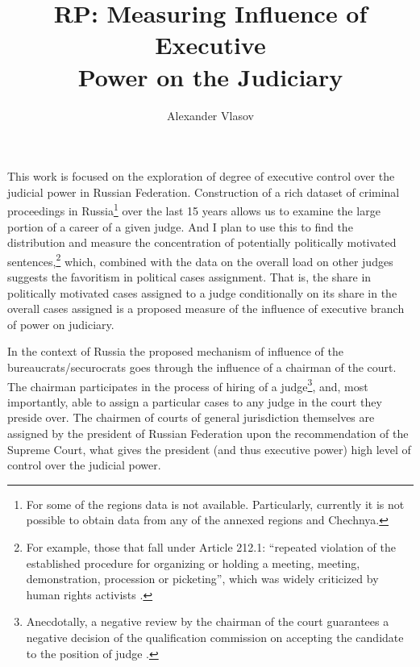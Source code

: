 \documentclass[a4paper,12pt]{article}
\author{Alexander Vlasov}
\title{RP: Measuring Influence of Executive \\ Power on the Judiciary}
\numberwithin{equation}{problem}
\begin{document}
\maketitle 



This work is focused on the exploration of degree of executive control over the judicial power in Russian Federation.
Construction of a rich dataset of criminal proceedings in Russia\footnote{For some of the regions data is not available. Particularly, currently it is not possible to obtain data from any of the annexed regions and Chechnya.} over the last 15 years allows us to examine the large portion of a career of a given judge. 
And I plan to use this to find the distribution and measure the concentration of potentially politically motivated sentences,\footnote{For example, those that fall under Article 212.1: ``repeated violation of the established procedure for organizing or holding a meeting, meeting, demonstration, procession or picketing'', which was widely criticized by human rights activists \citep{Amnesty2008}.} which, combined with the data on the overall load on other judges suggests the favoritism in political cases assignment. 
That is, the share in politically motivated cases assigned to a judge conditionally on its share in the overall cases assigned is a proposed measure of the influence of executive branch of power on judiciary.



In the context of Russia the proposed mechanism of influence of the bureaucrats/securocrats goes through the influence of a chairman of the court. 
The chairman participates in the process of hiring of a judge\footnote{Anecdotally, a negative review by the chairman of the court guarantees a negative decision of the qualification commission on accepting the candidate to the position of judge \citep{Makarova2017}.}, and, most importantly, able to assign a particular cases to any judge in the court they preside over. 
The chairmen of courts of general jurisdiction themselves are assigned by the president of Russian Federation upon the recommendation of the Supreme Court, what gives the president (and thus executive power) high level of control over the judicial power.
\end{document}
